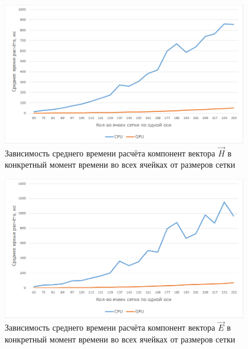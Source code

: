 \begin{figure}[p]
\centering
\captionsetup{justification=centering}
\includegraphics[width=0.95\textwidth]{include/graphics/image12}
\caption{Зависимость среднего времени расчёта компонент вектора $\vec{H}$ в конкретный момент времени во всех ячейках от размеров сетки}
\label{fig:1stComparsion}
\end{figure}
\begin{figure}[p]
\centering
\captionsetup{justification=centering}
\includegraphics[width=0.95\textwidth]{include/graphics/image13}
\caption{Зависимость среднего времени расчёта компонент вектора $\vec{E}$ в конкретный момент времени во всех ячейках от размеров сетки}
\label{fig:2ndComparsion}
\end{figure}


\clearpage